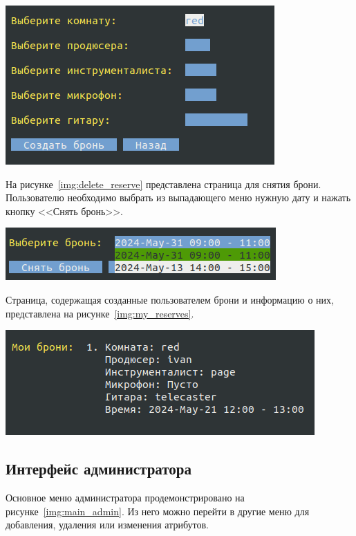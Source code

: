 \begin{center}
	\centering
	\includegraphics[height=0.22\textheight]{inc/img/create_reserve.png}
	\label{img:reserve_create}
\end{center}

На рисунке~\ref{img:delete_reserve} представлена страница для снятия брони.
Пользователю необходимо выбрать из выпадающего меню нужную дату и нажать кнопку <<Снять бронь>>.

\begin{center}
	\centering
	\includegraphics[height=0.07\textheight]{inc/img/delete_reserve.png}
	\label{img:delete_reserve}
\end{center}

Страница, содержащая созданные пользователем брони и информацию о них, представлена на рисунке~\ref{img:my_reserves}.
 

\begin{center}
	\centering
	\includegraphics[height=0.12\textheight]{inc/img/my_reserves.png}
	\label{img:my_reserves}
\end{center}


\subsection{Интерфейс администратора}
Основное меню администратора продемонстрировано на рисунке~\ref{img:main_admin}.
Из него можно перейти в другие меню для добавления, удаления или изменения атрибутов.

